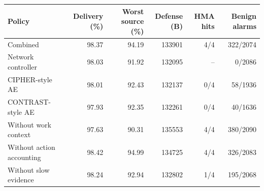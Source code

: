 \begin{tabular}{lrrrrr}
\hline
Policy & Delivery (\%) & Worst source (\%) & Defense (B) & HMA hits & Benign alarms \\
\hline
Combined & 98.37 & 94.19 & 133901 & 4/4 & 322/2074 \\
Network controller & 98.03 & 91.92 & 132095 & -- & 0/2086 \\
CIPHER-style AE & 98.01 & 92.43 & 132137 & 0/4 & 58/1936 \\
CONTRAST-style AE & 97.93 & 92.35 & 132261 & 0/4 & 40/1636 \\
Without work context & 97.63 & 90.31 & 135553 & 4/4 & 380/2090 \\
Without action accounting & 98.42 & 94.99 & 134725 & 4/4 & 326/2083 \\
Without slow evidence & 98.24 & 92.94 & 132802 & 1/4 & 195/2068 \\
\hline
\end{tabular}
